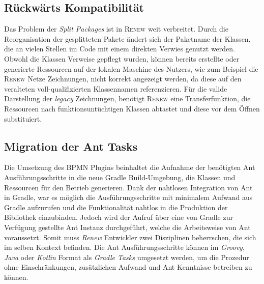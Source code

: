  \subsection*{Rückwärts Kompatibilität}
	Das Problem der \textit{Split Packages} ist in \textsc{Renew} weit verbreitet. Durch die Reorganisation der gesplitteten Pakete ändert sich der Paketname der Klassen, die an vielen Stellen im Code mit einem direkten Verwies genutzt werden. Obwohl die Klassen Verweise gepflegt wurden, können bereits erstellte oder generierte Ressourcen auf der lokalen Maschine des Nutzers, wie zum Beispiel die \textsc{Renew} Netze Zeichnungen, nicht korrekt angezeigt werden, da diese auf den veralteten voll-qualifizierten Klassennamen referenzieren.\newline
	Für die valide Darstellung der \textit{legacy} Zeichnungen, benötigt \textsc{Renew} eine Transferfunktion, die Ressourcen nach funktionsuntüchtigen Klassen abtastet und diese vor dem Öffnen substituiert.
	
 \subsection*{Migration der Ant Tasks}
	Die Umsetzung des BPMN Plugins beinhaltet die Aufnahme der benötigten Ant Ausführungsschritte in die neue Gradle Build-Umgebung, die Klassen und Ressourcen für den Betrieb generieren. Dank der nahtlosen Integration von Ant in Gradle, war es möglich die Ausführungsschritte mit minimalem Aufwand aus Gradle aufzurufen und die Funktionalität nahtlos in die Produktion der Bibliothek einzubinden. Jedoch wird der Aufruf über eine von Gradle zur Verfügung gestellte Ant Instanz durchgeführt, welche die Arbeitsweise von Ant voraussetzt. Somit muss \textit{Renew} Entwickler zwei Disziplinen beherrschen, die sich im selben Kontext befinden.\newline
	Die Ant Ausführungsschritte können im \textit{Groovy}, \textit{Java} oder \textit{Kotlin} Format als \textit{Gradle Tasks} umgesetzt werden, um die Prozedur ohne Einschränkungen, zusätzlichen Aufwand und Ant Kenntnisse betreiben zu können. 
	
